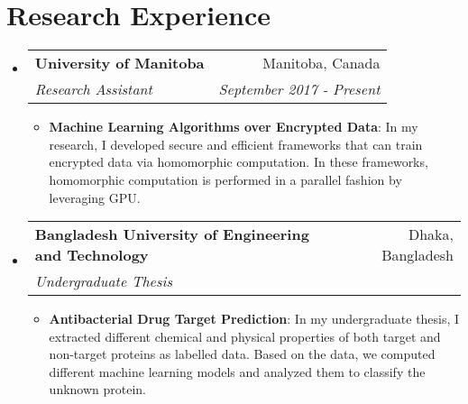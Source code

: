 \documentclass[letterpaper,11pt]{article}
\makeatletter
\newcommand{\resumeItem}[2]{
  \item\small{
    \textbf{#1}{: #2 \vspace{-2pt}}
  }
}
\newcommand{\resumeSubheading}[4]{
  \vspace{-1pt}\item
    \begin{tabular*}{0.97\textwidth}{l@{\extracolsep{\fill}}r}
      \textbf{#1} & #2 \\
      \textit{\small#3} & \textit{\small #4} \\
    \end{tabular*}\vspace{-5pt}
}
\newcommand{\resumeSubHeadingListStart}{\begin{itemize}[leftmargin=*]}
\newcommand{\resumeSubHeadingListEnd}{\end{itemize}}
\newcommand{\resumeItemListStart}{\begin{itemize}}
\newcommand{\resumeItemListEnd}{\end{itemize}\vspace{-5pt}}
\makeatother
\begin{document}
\section{Research Experience}
    \resumeSubHeadingListStart
        \resumeSubheading
            {University of Manitoba}
            {Manitoba, Canada}
            {Research Assistant}
            {September 2017 - Present}
            \resumeItemListStart
                \resumeItem
                    {Machine Learning Algorithms over Encrypted Data}
                    {In my research, I developed secure and efficient frameworks that can train encrypted data via homomorphic computation. In these frameworks, homomorphic computation is performed in a parallel fashion by leveraging GPU.}
            \resumeItemListEnd
        \resumeSubheading
            {Bangladesh University of Engineering and Technology}
            {Dhaka, Bangladesh}
            {Undergraduate Thesis}
            {}
            \resumeItemListStart
                \resumeItem
                    {Antibacterial Drug Target Prediction}
                    {In my undergraduate thesis, I extracted different chemical and physical properties of both target and non-target proteins as labelled data. Based on the data, we computed different machine learning models and analyzed them to classify the unknown protein.}
            \resumeItemListEnd
        \resumeSubHeadingListEnd
\end{document}

